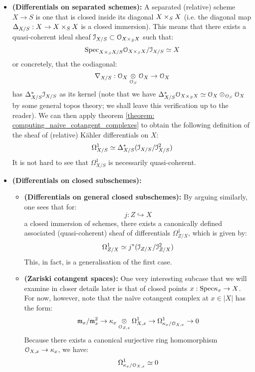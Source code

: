                 \begin{corollary} \label{coro: naive_cotangent_complex_of_separated_schemes_and_closed_subschemes}
                    \noindent
                    \begin{itemize}
                        \item \textbf{(Differentials on separated schemes):} A separated (relative) scheme $X \to S$ is one that is closed inside its diagonal $X \x_S X$ (i.e. the diagonal map $\Delta_{X/S}: X \to X \x_S X$ is a closed immersion). This means that there exists a quasi-coherent ideal sheaf $\calI_{X/S} \subset \calO_{X \x_S X}$ such that:
                        $$\Spec_{X \x_S X/S} \calO_{X \x_S X}/\calI_{X/S} \cong X$$
                        or concretely, that the codiagonal:
                            $$\nabla_{X/S}: \calO_X \tensor_{\calO_S} \calO_X \to \calO_X$$
                        has $\Delta^*_{X/S} \mathcal{I}_{X/S}$ as its kernel (note that we have $\Delta^*_{X/S} \calO_{X \x_S X} \cong \calO_X \tensor_{\calO_S} \calO_X$ by some general topos theory; we shall leave this verification up to the reader). We can then apply theorem \ref{theorem: computing_naive_cotangent_complexes} to obtain the following definition of the sheaf of (relative) K\"ahler differentials on $X$:
                            $$\Omega^1_{X/S} \simeq \Delta^*_{X/S}(\mathcal{I}_{X/S}/\mathcal{I}_{X/S}^2)$$
                        It is not hard to see that $\Omega^1_{X/S}$ is necessarily quasi-coherent.
                        \item \textbf{(Differentials on closed subschemes):}
                            \begin{itemize}
                                \item \textbf{(Differentials on general closed subschemes):} By arguing similarly, one sees that for:
                                    $$j: Z \hookrightarrow X$$
                                a closed immersion of schemes, there exists a canonically defined associated (quasi-coherent) sheaf of differentials $\Omega^1_{Z/X}$, which is given by:
                                    $$\Omega^1_{Z/X} \simeq j^*(\mathcal{I}_{Z/X}/\mathcal{I}_{Z/X}^2)$$
                                This, in fact, is a generalisation of the first case.
                                \item \textbf{(Zariski cotangent spaces):} One very interesting subcase that we will examine in closer details later is that of closed points $x: \mathrm{Spec} \kappa_x \to X$. For now, however, note that the na\"ive cotangent complex at $x \in |X|$ has the form:
                                    $$\m_x/\m_x^2 \to \kappa_x \tensor_{\calO_{Z, z}} \Omega^1_{X, x} \to \Omega^1_{\kappa_x/\calO_{X, x}} \to 0$$
                                Because there exists a canonical surjective ring homomorphism $\mathcal{O}_{X, x} \to \kappa_x$, we have:
                                    $$\Omega^1_{\kappa_x/\mathcal{O}_{X, x}} \simeq 0$$
                            \end{itemize}
                    \end{itemize}
                \end{corollary}
    
